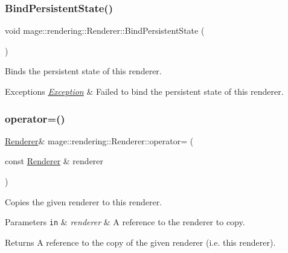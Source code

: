 \subsubsection{\texorpdfstring{Bind\+Persistent\+State()}{BindPersistentState()}}
{\footnotesize\ttfamily void mage\+::rendering\+::\+Renderer\+::\+Bind\+Persistent\+State (\begin{DoxyParamCaption}{ }\end{DoxyParamCaption})}

Binds the persistent state of this renderer.


\begin{DoxyExceptions}{Exceptions}
{\em \hyperlink{classmage_1_1_exception}{Exception}} & Failed to bind the persistent state of this renderer. \\
\hline
\end{DoxyExceptions}
\hypertarget{classmage_1_1rendering_1_1_renderer_a23338d210ca0008a05cf060f35d4dc70}{}\label{classmage_1_1rendering_1_1_renderer_a23338d210ca0008a05cf060f35d4dc70} 
\subsubsection{\texorpdfstring{operator=()}{operator=()}\hspace{0.1cm}{\footnotesize\ttfamily [1/2]}}
{\footnotesize\ttfamily \hyperlink{classmage_1_1rendering_1_1_renderer}{Renderer}\& mage\+::rendering\+::\+Renderer\+::operator= (\begin{DoxyParamCaption}\item[{const \hyperlink{classmage_1_1rendering_1_1_renderer}{Renderer} \&}]{renderer }\end{DoxyParamCaption})\hspace{0.3cm}{\ttfamily [delete]}}

Copies the given renderer to this renderer.


\begin{DoxyParams}[1]{Parameters}
\mbox{\tt in}  & {\em renderer} & A reference to the renderer to copy. \\
\hline
\end{DoxyParams}
\begin{DoxyReturn}{Returns}
A reference to the copy of the given renderer (i.\+e. this renderer). 
\end{DoxyReturn}
\hypertarget{classmage_1_1rendering_1_1_renderer_a8f0f0323dc57cf2e1f76491bf6eaa97a}{}\label{classmage_1_1rendering_1_1_renderer_a8f0f0323dc57cf2e1f76491bf6eaa97a} 
